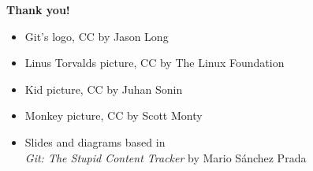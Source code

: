 \begin{frame}

  \vspace{60pt}
  \begin{center}
    \Huge{\textbf{Thank you!}}
  \end{center}

  \vspace{60pt}
  \begin{scriptsize}
    \begin{itemize}
      \item Git's logo, CC by Jason Long
      \item Linus Torvalds picture, CC by The Linux Foundation
      \item Kid picture, CC by Juhan Sonin
      \item Monkey picture, CC by Scott Monty
      \item Slides and diagrams based in \\\textit{Git: The Stupid Content Tracker} by Mario Sánchez Prada
    \end{itemize}
  \end{scriptsize}

\end{frame}


